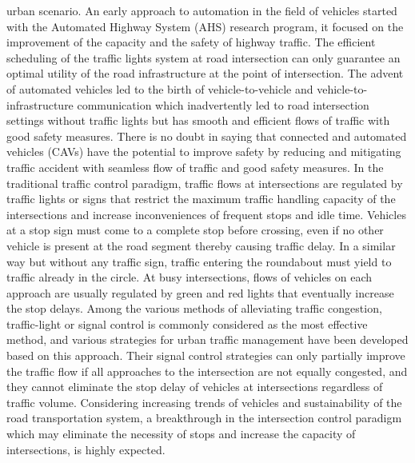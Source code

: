 \documentclass{book}
\begin{document}
urban scenario. An early approach to automation in the field of vehicles started with the Automated Highway System (AHS) research program\cite{horowitz2000control}, it focused on the improvement of the capacity and the safety of highway traffic. The efficient scheduling of the traffic lights system at road intersection can only guarantee an optimal utility of the road infrastructure at the point of intersection\cite{schrank2012tti}. The advent of automated vehicles led to the birth of vehicle-to-vehicle and vehicle-to-infrastructure communication which inadvertently led to road intersection settings without traffic lights but has smooth and efficient flows of traffic with good safety measures. There is no doubt in saying that connected and automated vehicles (CAVs) have the potential to improve safety by reducing and mitigating traffic accident with seamless flow of traffic and good safety measures.  In the traditional traffic control paradigm, traffic flows at intersections are regulated by traffic lights or signs that restrict the maximum traffic handling capacity of the intersections and increase inconveniences of frequent stops and idle time. Vehicles at a stop sign must come to a complete stop before crossing, even if no other vehicle is present at the road segment thereby causing traffic delay. In a similar way but without any traffic sign, traffic entering the roundabout must yield to traffic already in the circle. At busy intersections, flows of vehicles on each approach are usually regulated by green and red lights that eventually increase the stop delays.	 Among the various methods of alleviating traffic congestion, traffic-light or signal control is commonly considered as the most effective method, and various strategies for urban traffic management have been developed based on this approach\cite{papageorgiou2003review,treiber2000congested,kamal2012control}. Their signal control strategies can only partially improve the traffic flow if all approaches to the intersection are not equally congested, and they cannot eliminate the stop delay of vehicles at intersections regardless of traffic volume. Considering increasing trends of vehicles and sustainability of the road transportation system, a breakthrough in the intersection control paradigm which may eliminate the necessity of stops and increase the capacity of intersections, is highly expected.\\
\end{document}
